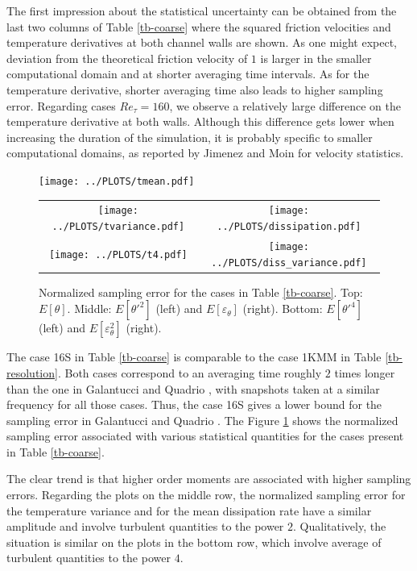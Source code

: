 \documentclass[review]{elsarticle}
\newcommand{\gqcite}{Galantucci and Quadrio \cite{galantucci2010very}}
\newcommand{\epst}{\varepsilon_\theta}
\begin{document}
The first impression about the statistical uncertainty can be obtained from the last two columns of Table \ref{tb-coarse} where the squared friction velocities and temperature derivatives at both channel walls are shown. As one might expect, deviation from the theoretical friction velocity of $1$ is larger in the smaller computational domain and at shorter averaging time intervals. As for the temperature derivative, shorter averaging time also leads to higher sampling error. Regarding cases $Re_\tau=160$, we observe a relatively large difference on the temperature derivative at both walls. Although this difference gets lower when increasing the duration of the simulation, it is probably specific to smaller computational domains, as reported by Jimenez and Moin \cite{jimenez1991minimal} for velocity statistics.

\begin{figure}[htbp]
\begin{center}
\texttt{[image: ../PLOTS/tmean.pdf]}
\begin{tabular}{cc}
\texttt{[image: ../PLOTS/tvariance.pdf]} & 
\texttt{[image: ../PLOTS/dissipation.pdf]} \\
\texttt{[image: ../PLOTS/t4.pdf]} & 
\texttt{[image: ../PLOTS/diss\_variance.pdf]}
\end{tabular}
\end{center}
\caption{Normalized sampling error for the cases in Table \ref{tb-coarse}. Top: $E\left[ \theta \right]$. Middle: $E\left[ \theta'^2 \right]$ (left) and $E\left[ \epst \right]$ (right). Bottom: $E\left[ \theta'^4 \right]$ (left) and $E\left[ \epst^2 \right]$ (right).}
\label{fig-coarse}
\end{figure}

The case 16S in Table \ref{tb-coarse} is comparable to the case 1KMM in Table \ref{tb-resolution}. Both cases correspond to an averaging time roughly $2$ times longer than the one in \gqcite, with snapshots taken at a similar frequency for all those cases. Thus, the case 16S gives a lower bound for the sampling error in \gqcite. The Figure \ref{fig-coarse} shows the normalized sampling error associated with various statistical quantities for the cases present in Table \ref{tb-coarse}.

The clear trend is that higher order moments are associated with higher sampling errors. Regarding the plots on the middle row, the normalized sampling error for the temperature variance and for the mean dissipation rate have a similar amplitude and involve turbulent quantities to the power $2$. Qualitatively, the situation is similar on the plots in the bottom row, which involve average of turbulent quantities to the power $4$.
\end{document}
